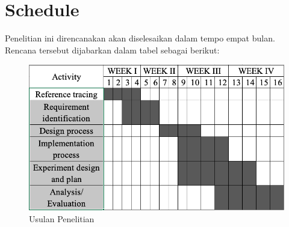 \section{Schedule}


Penelitian ini direncanakan akan diselesaikan dalam tempo empat bulan. Rencana tersebut dijabarkan dalam tabel sebagai berikut:








\begin{figure}[H]
	\centering
	\includegraphics[width=0.9\linewidth]{figure/Chart-ThesisQ.png}
	\caption{Usulan Penelitian}
	\label{fig:chart-thesisq}
\end{figure}


